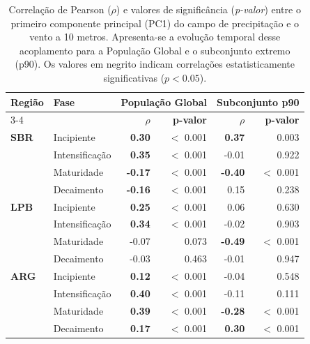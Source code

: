 \begin{table}[htbp]
\centering
\caption[Coerência temporal entre precipitação e vento a 10m (Global e p90)]{Correlação de Pearson ($\rho$) e valores de significância (\textit{p-valor}) entre o primeiro componente principal (PC1) do campo de precipitação e o vento a 10 metros. Apresenta-se a evolução temporal desse acoplamento para a População Global e o subconjunto extremo (p90). Os valores em negrito indicam correlações estatisticamente significativas ($p < 0.05$).}
\label{tab:meof_coherencia}
\begin{tabular*}{\textwidth}{@{\extracolsep{\fill}}llrrrr}
\hline
\textbf{Região} & \textbf{Fase} & \multicolumn{2}{c}{\textbf{População Global}} & \multicolumn{2}{c}{\textbf{Subconjunto p90}} \\
\cline{3-4} \cline{5-6}
 & & \textbf{$\rho$} & \textbf{p-valor} & \textbf{$\rho$} & \textbf{p-valor} \\
\hline
\textbf{SBR} & Incipiente & \textbf{0.30} & $<$ 0.001 & \textbf{0.37} & 0.003 \\
 & Intensificação & \textbf{0.35} & $<$ 0.001 & -0.01 & 0.922 \\
 & Maturidade & \textbf{-0.17} & $<$ 0.001 & \textbf{-0.40} & $<$ 0.001 \\
 & Decaimento & \textbf{-0.16} & $<$ 0.001 & 0.15 & 0.238 \\
\hline
\textbf{LPB} & Incipiente & \textbf{0.25} & $<$ 0.001 & 0.06 & 0.630 \\
 & Intensificação & \textbf{0.34} & $<$ 0.001 & -0.02 & 0.903 \\
 & Maturidade & -0.07 & 0.073 & \textbf{-0.49} & $<$ 0.001 \\
 & Decaimento & -0.03 & 0.463 & -0.01 & 0.947 \\
\hline
\textbf{ARG} & Incipiente & \textbf{0.12} & $<$ 0.001 & -0.04 & 0.548 \\
 & Intensificação & \textbf{0.40} & $<$ 0.001 & -0.11 & 0.111 \\
 & Maturidade & \textbf{0.39} & $<$ 0.001 & \textbf{-0.28} & $<$ 0.001 \\
 & Decaimento & \textbf{0.17} & $<$ 0.001 & \textbf{0.30} & $<$ 0.001 \\
\hline
\end{tabular*}
\end{table}